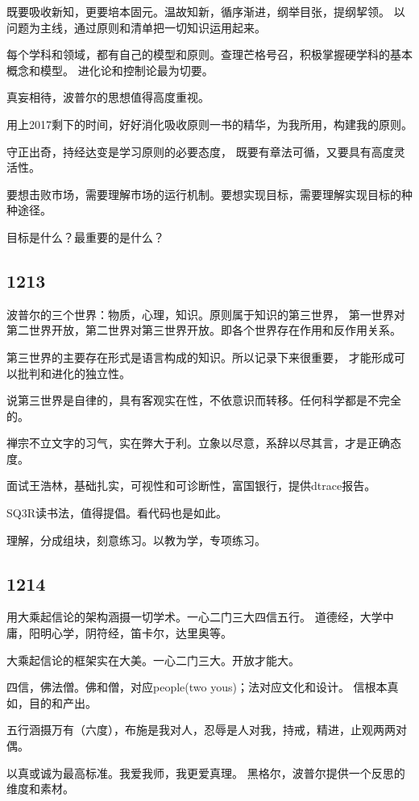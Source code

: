 既要吸收新知，更要培本固元。温故知新，循序渐进，纲举目张，提纲挈领。
以问题为主线，通过原则和清单把一切知识运用起来。

每个学科和领域，都有自己的模型和原则。查理芒格号召，积极掌握硬学科的基本概念和模型。
进化论和控制论最为切要。

真妄相待，波普尔的思想值得高度重视。

用上2017剩下的时间，好好消化吸收原则一书的精华，为我所用，构建我的原则。

守正出奇，持经达变是学习原则的必要态度，
既要有章法可循，又要具有高度灵活性。

要想击败市场，需要理解市场的运行机制。要想实现目标，需要理解实现目标的种种途径。

目标是什么？最重要的是什么？

\subsection{1213}

波普尔的三个世界：物质，心理，知识。原则属于知识的第三世界，
第一世界对第二世界开放，第二世界对第三世界开放。即各个世界存在作用和反作用关系。

第三世界的主要存在形式是语言构成的知识。所以记录下来很重要，
才能形成可以批判和进化的独立性。

说第三世界是自律的，具有客观实在性，不依意识而转移。任何科学都是不完全的。

禅宗不立文字的习气，实在弊大于利。立象以尽意，系辞以尽其言，才是正确态度。

面试王浩林，基础扎实，可视性和可诊断性，富国银行，提供dtrace报告。

SQ3R读书法，值得提倡。看代码也是如此。

理解，分成组块，刻意练习。以教为学，专项练习。

\subsection{1214}

用大乘起信论的架构涵摄一切学术。一心二门三大四信五行。
道德经，大学中庸，阳明心学，阴符经，笛卡尔，达里奥等。

大乘起信论的框架实在大美。一心二门三大。开放才能大。

四信，佛法僧。佛和僧，对应people(two yous)；法对应文化和设计。
信根本真如，目的和产出。

五行涵摄万有（六度），布施是我对人，忍辱是人对我，持戒，精进，止观两两对偶。

以真或诚为最高标准。我爱我师，我更爱真理。
黑格尔，波普尔提供一个反思的维度和素材。

